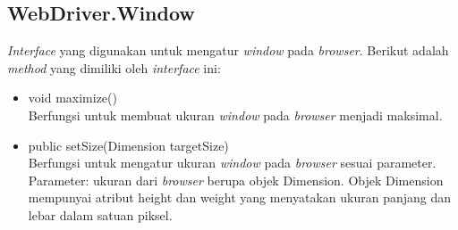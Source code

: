
\subsection{WebDriver.Window}
\label{subsec:webdriveroption}
\textit{Interface} yang digunakan untuk mengatur \textit{window} pada \textit{browser}. Berikut adalah \textit{method} yang dimiliki oleh \textit{interface} ini:
\begin{itemize}
\item void maximize()\\
Berfungsi untuk membuat ukuran \textit{window} pada \textit{browser} menjadi maksimal.
\item public setSize(Dimension targetSize)\\
Berfungsi untuk mengatur ukuran \textit{window} pada \textit{browser} sesuai parameter.\\
Parameter: ukuran dari \textit{browser} berupa objek Dimension. Objek Dimension mempunyai atribut height dan weight yang menyatakan ukuran panjang dan lebar dalam satuan piksel.
\end{itemize}

